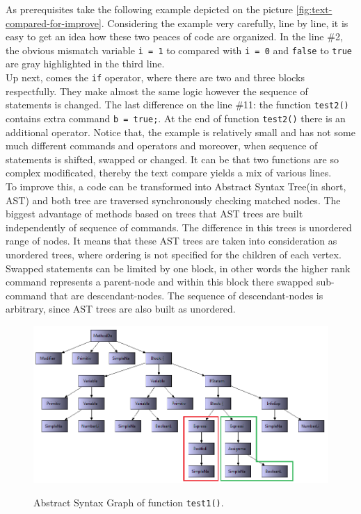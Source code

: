\documentclass{report}
\begin{document}
As prerequisites take the following example depicted on the picture \ref{fig:text-compared-for-improve}. Considering the example very carefully, line by line, it is easy to get an idea how these two peaces of code are organized. In the line \#2, the obvious mismatch variable \texttt{i = 1} to compared with \texttt{i = 0} and \texttt{false} to \texttt{true} are gray highlighted in the third line.
\\
Up next, comes the \texttt{if} operator, where there are two and three blocks respectfully. They make almost the same logic however the sequence of statements is changed.
The last difference on the line \#11: the function \texttt{test2()} contains extra command \texttt{b = true;}.
At the end of function \texttt{test2()} there is an additional operator. Notice that, the example is relatively small and has not some much different commands and operators and moreover, when sequence of statements is shifted, swapped or changed. It can be that two functions are so complex modificated, thereby the text compare yields a mix of various lines. 
\\
To improve this, a code can be transformed into Abstract Syntax Tree(in short, AST) and both tree are traversed synchronously checking matched nodes. The biggest advantage of methods based on trees that AST trees are built independently of sequence of commands. The difference in this trees is unordered range of nodes. It means that these AST trees are taken into consideration as unordered trees, where ordering is not specified for the children of each vertex. Swapped statements can be limited by one block, in other words the higher rank command represents a parent-node and within this block there swapped sub-command that are 
descendant-nodes. The sequence of descendant-nodes is arbitrary, since AST trees are also built as unordered.\\
\begin{figure}[h]
  \centering
  \includegraphics[width=1.00\textwidth]{Figures/text-to-text/graph-compared1.png}\\[0.1cm]
  \caption[Abstract Syntax Graph  of function \texttt{test1()}]{Abstract Syntax Graph  of function \texttt{test1()}.}
  \label{fig:graph-compared1}
\end{figure}
\end{document}
